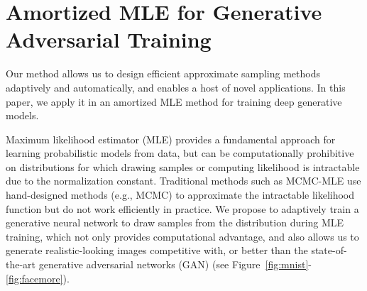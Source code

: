 \documentclass{article} %
\begin{document}
\section{Amortized MLE for Generative Adversarial Training}
Our method allows us to design efficient approximate sampling methods 
adaptively and automatically, and enables a host of novel applications. 
In this paper, we apply it in an amortized MLE method for training deep generative models.   

 Maximum likelihood estimator (MLE) provides a fundamental approach for learning probabilistic models from data, 
but can be computationally prohibitive on distributions for which drawing samples or computing likelihood is intractable due to the normalization constant. 
Traditional methods such as MCMC-MLE use hand-designed methods (e.g., MCMC) to approximate the intractable likelihood function but do not work efficiently in practice. 
We propose to adaptively train a generative neural network to draw samples from the distribution during MLE training, which not only provides computational advantage, and also allows us to generate realistic-looking images competitive with, or better than the state-of-the-art generative adversarial networks (GAN) \citep{goodfellow2014generative, radford2015unsupervised} (see Figure~\ref{fig:mnist}-\ref{fig:facemore}).  
\end{document}
